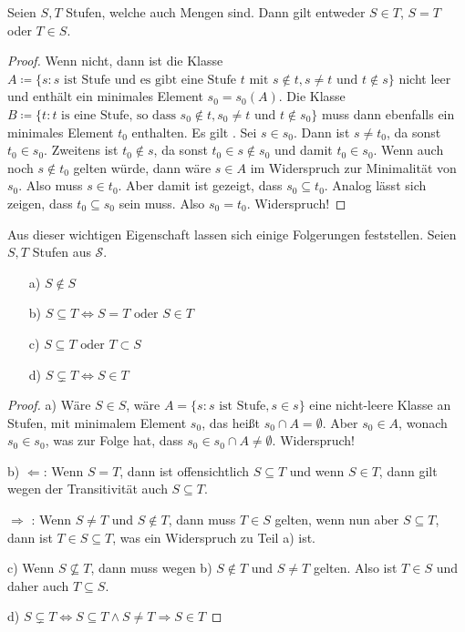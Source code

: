 \begin{satz}
	Seien $S, T$ Stufen, welche auch Mengen sind. Dann gilt entweder $S\in T$, $S=T$ oder $T \in S$.
\end{satz}
\begin{proof}
	Wenn nicht, dann ist die Klasse $A\coloneqq\{s : s \text{ ist Stufe und es gibt eine Stufe } t \text{ mit } s \notin t, s\neq t \text{ und } t \notin s\}$ nicht leer und enthält ein minimales Element $s_0=s_0(A)$. 
	Die Klasse $B\coloneqq\{t : t \text{ is eine Stufe, so dass } s_0 \notin t, s_0\neq t \text{ und } t \notin s_0\}$ muss dann ebenfalls ein minimales Element $t_0$ enthalten.
	Es gilt .
	Sei $s\in s_0$. Dann ist $s\neq t_0$, da sonst $t_0\in s_0$.
	Zweitens ist $t_0 \notin s$, da sonst $t_0\in s \notin s_0$ und damit $t_0\in s_0$.
	Wenn auch noch $s\notin t_0$ gelten würde, dann wäre $s\in A$ im Widerspruch zur Minimalität von $s_0$. Also muss $s\in t_0$. Aber damit ist gezeigt, dass $s_0\subseteq t_0$. Analog lässt sich zeigen, dass $t_0\subseteq s_0$ sein muss. Also $s_0=t_0$. Widerspruch!
\end{proof}
Aus dieser wichtigen Eigenschaft lassen sich einige Folgerungen feststellen. Seien $S, T$ Stufen aus $\mathcal{S}$.
\begin{enumerate}
	\item[a)] $S\notin S$
	\item[b)] $S\subseteq T \Leftrightarrow S=T \text{ oder } S \in T$
	\item[c)] $S\subseteq T \text{ oder } T\subset S$
	\item[d)] $S\subsetneq T \Leftrightarrow S\in T$
\end{enumerate}
\begin{proof}
	a) Wäre $S\in S$, wäre $A=\{s : s \text{ ist Stufe}, s\in s\}$ eine nicht-leere Klasse an Stufen, mit minimalem Element $s_0$, das heißt $s_0\cap A=\emptyset$. 
	Aber $s_0\in A$, wonach $s_0\in s_0$, was zur Folge hat, dass $s_0\in s_0\cap A\neq \emptyset$. Widerspruch!
	
	b) \glqq$\Leftarrow$\grqq: Wenn $S=T$, dann ist offensichtlich $S\subseteq T$ und wenn $S\in T$, dann gilt wegen der Transitivität auch $S\subseteq T$.
	
	\glqq $\Rightarrow$ \grqq: Wenn $S\neq T$ und $S\notin T$, dann muss $T\in S$ gelten, wenn nun aber $S\subseteq T$, dann ist $T\in S\subseteq T$, was ein Widerspruch zu Teil a) ist.
	
	c) Wenn $S\not\subseteq T$, dann muss wegen b) $S\notin T$ und $S\neq T$ gelten. Also ist $T\in S$ und daher auch $T\subseteq S$.
	
	d) $S\subsetneq T \Leftrightarrow S\subseteq T \land S\neq T \Rightarrow S\in T$
\end{proof}

